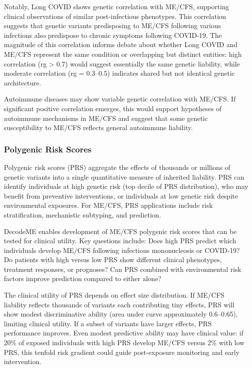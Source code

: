Notably, Long COVID shows genetic correlation with ME/CFS, supporting clinical observations of similar post-infectious phenotypes. This correlation suggests that genetic variants predisposing to ME/CFS following various infections also predispose to chronic symptoms following COVID-19. The magnitude of this correlation informs debate about whether Long COVID and ME/CFS represent the same condition or overlapping but distinct entities: high correlation (rg > 0.7) would suggest essentially the same genetic liability, while moderate correlation (rg = 0.3--0.5) indicates shared but not identical genetic architecture.

Autoimmune diseases may show variable genetic correlation with ME/CFS. If significant positive correlation emerges, this would support hypotheses of autoimmune mechanisms in ME/CFS and suggest that some genetic susceptibility to ME/CFS reflects general autoimmune liability.

\subsubsection{Polygenic Risk Scores}

Polygenic risk scores (PRS) aggregate the effects of thousands or millions of genetic variants into a single quantitative measure of inherited liability. PRS can identify individuals at high genetic risk (top decile of PRS distribution), who may benefit from preventive interventions, or individuals at low genetic risk despite environmental exposures. For ME/CFS, PRS applications include risk stratification, mechanistic subtyping, and prediction.

DecodeME enables development of ME/CFS polygenic risk scores that can be tested for clinical utility. Key questions include: Does high PRS predict which individuals develop ME/CFS following infectious mononucleosis or COVID-19? Do patients with high versus low PRS show different clinical phenotypes, treatment responses, or prognoses? Can PRS combined with environmental risk factors improve prediction compared to either alone?

The clinical utility of PRS depends on effect size distribution. If ME/CFS liability reflects thousands of variants each contributing tiny effects, PRS will show modest discriminative ability (area under curve approximately 0.6--0.65), limiting clinical utility. If a subset of variants have larger effects, PRS performance improves. Even modest predictive ability may have clinical value: if 20\% of exposed individuals with high PRS develop ME/CFS versus 2\% with low PRS, this tenfold risk gradient could guide post-exposure monitoring and early intervention.

